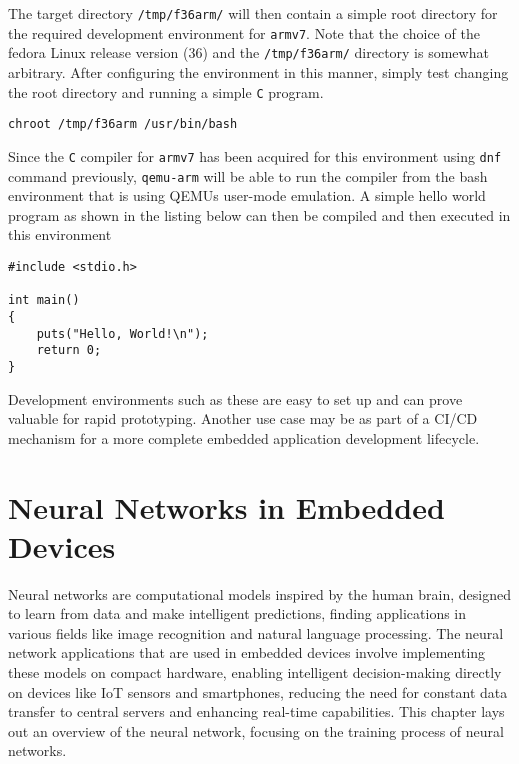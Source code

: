 The target directory \texttt{/tmp/f36arm/} will then contain a simple root directory for the required development environment for \texttt{armv7}. Note that the choice of the fedora Linux release version (36) and the \texttt{/tmp/f36arm/} directory is somewhat arbitrary. After configuring the environment in this manner, simply test changing the root directory and running a simple \texttt{C} program.

\begin{verbatim}
chroot /tmp/f36arm /usr/bin/bash
\end{verbatim}

Since the \texttt{C} compiler for \texttt{armv7} has been acquired for this environment using \texttt{dnf} command previously, \texttt{qemu-arm} will be able to run the compiler from the bash environment that is using QEMU\textquotesingle s user-mode emulation. A simple hello world program as shown in the listing below can then be compiled and then executed in this environment

\begin{verbatim}
#include <stdio.h>

int main()
{
	puts("Hello, World!\n");
	return 0;
}
\end{verbatim}

Development environments such as these are easy to set up and can prove valuable for rapid prototyping. Another use case may be as part of a CI/CD mechanism for a more complete embedded application development lifecycle.


\chapter{Neural Networks in Embedded Devices}

Neural networks are computational models inspired by the human brain, designed to learn from data and make intelligent predictions, finding applications in various fields like image recognition and natural language processing. The neural network applications that are used in embedded devices involve implementing these models on compact hardware, enabling intelligent decision-making directly on devices like IoT sensors and smartphones, reducing the need for constant data transfer to central servers and enhancing real-time capabilities. This chapter lays out an overview of the neural network, focusing on the training process of neural networks.

